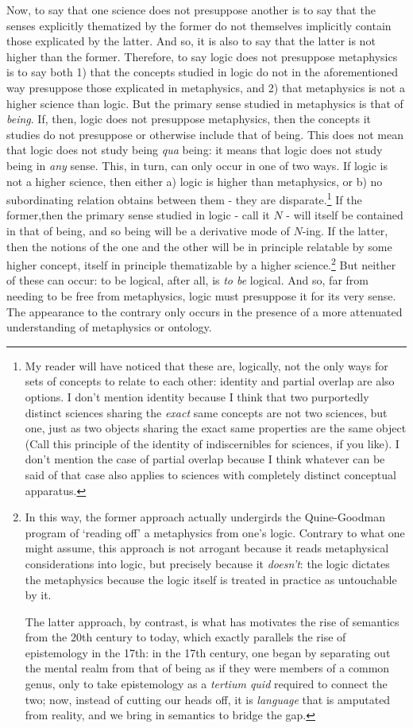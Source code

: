 \documentclass[]{article}
\begin{document}
Now, to say that one science does not presuppose another is to say that the senses explicitly thematized by the former do not themselves implicitly contain those explicated by the latter. And so, it is also to say that the latter is not higher than the former. Therefore, to say logic does not presuppose metaphysics is to say both 1) that the concepts studied in logic do not in the aforementioned way presuppose those explicated in metaphysics, and 2) that metaphysics is not a higher science than logic. But the primary sense studied in metaphysics is that of \textit{being}. If, then, logic does not presuppose metaphysics, then the concepts it studies do not presuppose or otherwise include that of being. This does not mean that logic does not study being \textit{qua} being: it means that logic does not study being in \textit{any} sense. This, in turn, can only occur in one of two ways. If logic is not a higher science, then either a) logic is higher than metaphysics, or b) no subordinating relation obtains between them - they are disparate.\footnote{My reader will have noticed that these are, logically, not the only ways for sets of concepts to relate to each other: identity and partial overlap are also options. I don't mention identity because I think that two purportedly distinct sciences sharing the \textit{exact} same concepts are not two sciences, but one, just as two objects sharing the exact same properties are the same object (Call this principle of the identity of indiscernibles for sciences, if you like). I don't mention the case of partial overlap because I think whatever can be said of that case also applies to sciences with completely distinct conceptual apparatus.} If the former,then the primary sense studied in logic - call it $N$ - will itself be contained in that of being, and so being will be a derivative mode of $N$-ing. If the latter, then the notions of the one and the other will be in principle relatable by some higher concept, itself in principle thematizable by a higher science.\footnote{In this way, the former approach actually undergirds the Quine-Goodman program of `reading off' a metaphysics from one's logic. Contrary to what one might assume, this approach is not arrogant because it reads metaphysical considerations into logic, but precisely because it \textit{doesn't}: the logic dictates the metaphysics because the logic itself is treated in practice as untouchable by it. 

The latter approach, by contrast, is what has motivates the rise of semantics from the 20th century to today, which exactly parallels the rise of epistemology in the 17th: in the 17th century, one began by separating out the mental realm from that of being as if they were members of a common genus, only to take epistemology as a \textit{tertium quid} required to connect the two; now, instead of cutting our heads off, it is \textit{language} that is amputated from reality, and we bring in semantics to bridge the gap.} But neither of these can occur: to be logical, after all, is \textit{to be} logical. And so, far from needing to be free from metaphysics, logic must presuppose it for its very sense. The appearance to the contrary only occurs in the presence of a more attenuated understanding of metaphysics or ontology.
\end{document}
